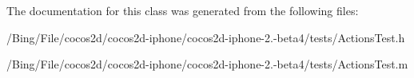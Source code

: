 The documentation for this class was generated from the following files\-:\begin{DoxyCompactItemize}
\item 
/\-Bing/\-File/cocos2d/cocos2d-\/iphone/cocos2d-\/iphone-\/2.-\/beta4/tests/Actions\-Test.\-h\item 
/\-Bing/\-File/cocos2d/cocos2d-\/iphone/cocos2d-\/iphone-\/2.-\/beta4/tests/Actions\-Test.\-m\end{DoxyCompactItemize}
